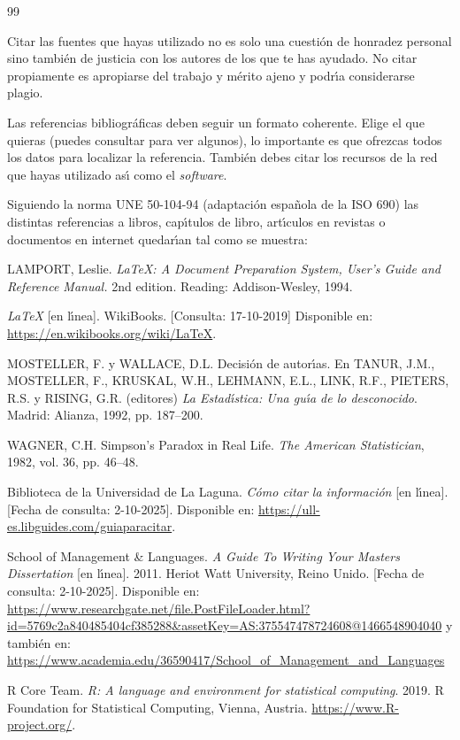 






\begin{thebibliography}{99}

Citar las fuentes que hayas utilizado no es solo una cuesti\'on de honradez personal sino tambi\'en de justicia con los autores de los que te has ayudado. No citar propiamente es apropiarse del trabajo y m\'erito ajeno y podr\'{\i}a considerarse plagio.

\medskip
Las referencias bibliogr\'aficas deben seguir un formato coherente. Elige el que quieras (puedes consultar \cite{bbtkULLcitas} para ver algunos), lo importante es que ofrezcas todos los datos para localizar la referencia. Tambi\'en debes citar los recursos de la red que hayas utilizado as\'{\i} como el \textsl{software}.

\medskip
Siguiendo la norma UNE 50-104-94 (adaptaci\'on espa\~nola de la ISO 690) las distintas referencias a libros, cap\'{\i}tulos de libro, art\'{\i}culos en revistas o documentos en internet quedar\'{\i}an tal como se muestra:
\bigskip


 LAMPORT, Leslie. 
\emph{\LaTeX: A Document Preparation System, User's Guide and Reference Manual.} 2nd edition.
Reading: Addison-Wesley, 1994. 


\emph{\LaTeX} [en l\'{\i}nea].
WikiBooks. [Consulta: 17-10-2019] Disponible en: \url{https://en.wikibooks.org/wiki/LaTeX}.


MOSTELLER, F. y WALLACE, D.L.
Decisi\'on de autor\'{\i}as.
En TANUR, J.M., MOSTELLER, F., KRUSKAL, W.H., LEHMANN, E.L., LINK, R.F., PIETERS, R.S. y RISING, G.R. (editores)
\emph{La Estad\'{\i}stica: Una gu\'{\i}a de lo desconocido}.
Madrid: Alianza, 1992, pp. 187--200.


WAGNER, C.H. Simpson's Paradox in Real Life.
\emph{The American Statistician}, 1982, vol. 36, pp. 46--48.


Biblioteca de la Universidad de La Laguna.
\emph{C\'omo citar la informaci\'on} [en l\'{\i}nea]. [Fecha de consulta: 2-10-2025].
Disponible en: \url{https://ull-es.libguides.com/guiaparacitar}.


School of Management \& Languages.
\emph{A Guide To Writing Your Masters Dissertation} [en l\'{\i}nea]. 2011.
Heriot Watt University, Reino Unido.
[Fecha de consulta: 2-10-2025].
Disponible en: \url{https://www.researchgate.net/file.PostFileLoader.html?id=5769c2a840485404cf385288&assetKey=AS:375547478724608@1466548904040}
y tambi\'en en: \url{https://www.academia.edu/36590417/School_of_Management_and_Languages}



R Core Team. 
\emph{R: A language and environment for statistical computing}.
2019.
R Foundation for Statistical Computing, Vienna, Austria.
\url{https://www.R-project.org/}.


\end{thebibliography} 

